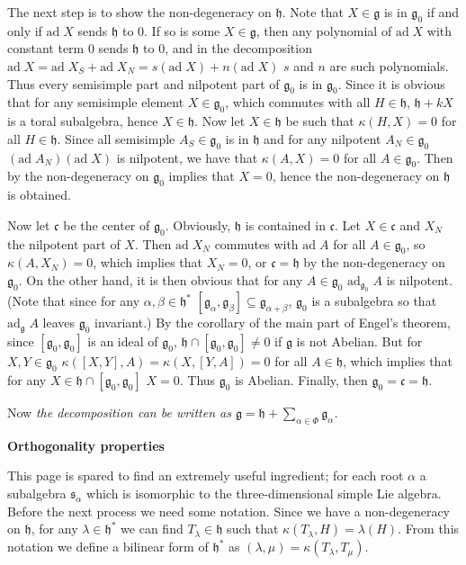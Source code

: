 \documentclass{article}
\newcommand{\lie}[1]{\mathfrak{#1}}
\newcommand{\ad}[1]{\mathrm{ad}\; #1}
\newcommand{\adu}[2]{\mathrm{ad}_{#1}\; #2}
\begin{document}
The next step is to show the non-degeneracy on $\lie{h}$.
Note that $X \in \lie{g}$ is in $\lie{g}_0$ if and only if $\ad{X}$ sends $\lie{h}$ to 0.
If so is some $X \in \lie{g}$, then any polynomial of $\ad{X}$ with constant term 0 sends $\lie{h}$ to 0, and in the decomposition $\ad{X} = \ad{X_S} + \ad{X_N} = s(\ad{X}) + n(\ad{X})$ $s$ and $n$ are such polynomials.
Thus every semisimple part and nilpotent part of $\lie{g}_0$ is in $\lie{g}_0$.
Since it is obvious that for any semisimple element $X \in \lie{g}_0$, which commutes with all $H \in \lie{h}$, $\lie{h} + kX$ is a toral subalgebra, hence $X \in \lie{h}$.
Now let $X \in \lie{h}$ be such that $\kappa(H, X) = 0$ for all $H \in \lie{h}$.
Since all semisimple $A_S \in \lie{g}_0$ is in $\lie{h}$ and for any nilpotent $A_N \in \lie{g}_0$ $(\ad{A_N})(\ad{X})$ is nilpotent, we have that $\kappa(A, X) = 0$ for all $A \in \lie{g}_0$.
Then by the non-degeneracy on $\lie{g}_0$ implies that $X = 0$, hence the non-degeneracy on $\lie{h}$ is obtained.

Now let $\lie{c}$ be the center of $\lie{g}_0$.
Obviously, $\lie{h}$ is contained in $\lie{c}$.
Let $X \in \lie{c}$ and $X_N$ the nilpotent part of $X$.
Then $\ad{X_N}$ commutes with $\ad{A}$ for all $A \in \lie{g}_0$, so $\kappa(A, X_N) = 0$, which implies that $X_N = 0$, or $\lie{c} = \lie{h}$ by the non-degeneracy on $\lie{g}_0$.
On the other hand, it is then obvious that for any $A \in \lie{g}_0$ $\adu{\lie{g}_0}{A}$ is nilpotent.
(Note that since for any $\alpha, \beta \in \lie{h}^*$ $[\lie{g}_\alpha, \lie{g}_\beta] \subseteq \lie{g}_{\alpha + \beta}$, $\lie{g}_0$ is a subalgebra so that $\adu{\lie{g}}{A}$ leaves $\lie{g}_0$ invariant.)
By the corollary of the main part of Engel's theorem, since $[\lie{g}_0, \lie{g}_0]$ is an ideal of $\lie{g}_0$, $\lie{h} \cap [\lie{g}_0, \lie{g}_0] \ne 0$ if $\lie{g}$ is not Abelian.
But for $X, Y \in \lie{g}_0$ $\kappa([X, Y], A) = \kappa(X, [Y, A]) = 0$ for all $A \in \lie{h}$, which implies that for any $X \in \lie{h} \cap [\lie{g}_0, \lie{g}_0]$ $X = 0$.
Thus $\lie{g}_0$ is Abelian.
Finally, then $\lie{g}_0 = \lie{c} = \lie{h}$.

Now \textit{the decomposition can be written as $\lie{g} = \lie{h} + \sum_{\alpha \in \Phi} \lie{g}_\alpha$.}

\newpage

\textbf{Orthogonality properties}

This page is spared to find an extremely useful ingredient; for each root $\alpha$ a subalgebra $\lie{s}_\alpha$ which is isomorphic to the three-dimensional simple Lie algebra.
Before the next process we need some notation.
Since we have a non-degeneracy on $\lie{h}$, for any $\lambda \in \lie{h}^*$ we can find $T_\lambda \in \lie{h}$ such that $\kappa(T_\lambda, H) = \lambda(H)$.
From this notation we define a bilinear form of $\lie{h}^*$ as $(\lambda, \mu) = \kappa(T_\lambda, T_\mu)$.
\end{document}
